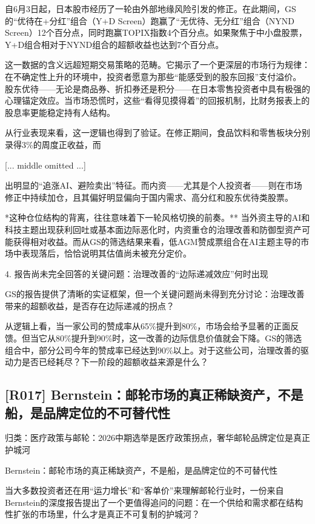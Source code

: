 \documentclass[11pt]{ctexart}
\begin{document}
自6月3日起，日本股市经历了一轮由外部地缘风险引发的修正。在此期间，GS的“优待在+分红”组合（Y+D Screen）跑赢了“无优待、无分红”组合（NYND Screen）12个百分点，同时跑赢TOPIX指数4个百分点。如果聚焦于中小盘股票，Y+D组合相对于NYND组合的超额收益也达到7个百分点。

这一数据的含义远超短期交易策略的范畴。它揭示了一个更深层的市场行为规律：在不确定性上升的环境中，投资者愿意为那些“能感受到的股东回报”支付溢价。 股东优待——无论是商品券、折扣券还是积分——在日本零售投资者中具有极强的心理锚定效应。当市场恐慌时，这些“看得见摸得着”的回报机制，比财务报表上的股息率更能稳定持有人结构。

从行业表现来看，这一逻辑也得到了验证。在修正期间，食品饮料和零售板块分别录得3\%的周度正收益，而

[... middle omitted ...]

出明显的“追涨AI、避险卖出”特征。而内资——尤其是个人投资者——则在市场修正中持续加仓，且其偏好明显偏向于国内需求、高分红和股东优待类股票。

*这种仓位结构的背离，往往意味着下一轮风格切换的前奏。** 当外资主导的AI和科技主题出现获利回吐或基本面边际恶化时，内资重仓的治理改善和防御型资产可能获得相对收益。而从GS的筛选结果来看，低AGM赞成票组合在AI主题主导的市场中表现落后，恰恰说明其估值尚未被充分定价。

4. 报告尚未完全回答的关键问题：治理改善的“边际递减效应”何时出现

GS的报告提供了清晰的实证框架，但一个关键问题尚未得到充分讨论：治理改善带来的超额收益，是否存在边际递减的拐点？

从逻辑上看，当一家公司的赞成率从65\%提升到80\%，市场会给予显著的正面反馈。但当它从80\%提升到90\%时，这一改善的边际信息价值就会下降。GS的筛选组合中，部分公司今年的赞成率已经达到90\%以上。对于这些公司，治理改善的驱动力是否已经耗尽？下一阶段的超额收益来源是什么？

\subsection{[R017] Bernstein：邮轮市场的真正稀缺资产，不是船，是品牌定位的不可替代性}
{\small\color{refgray}归类：医疗政策与邮轮：2026中期选举是医疗政策拐点，奢华邮轮品牌定位是真正护城河}

Bernstein：邮轮市场的真正稀缺资产，不是船，是品牌定位的不可替代性

当大多数投资者还在用“运力增长”和“客单价”来理解邮轮行业时，一份来自Bernstein的深度报告提出了一个更值得追问的问题：在一个供给和需求都在结构性扩张的市场里，什么才是真正不可复制的护城河？
\end{document}
